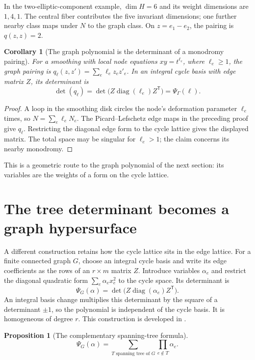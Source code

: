 \documentclass[11pt]{article}
\newtheorem{proposition}[theorem]{Proposition}
\newtheorem{corollary}[theorem]{Corollary}
\theoremstyle{definition}
\theoremstyle{remark}
\begin{document}
In the two-elliptic-component example, $\dim H=6$ and its weight dimensions
are $1,4,1$. The central fiber contributes the five invariant dimensions;
one further nearby class maps under $N$ to the graph class. On
$z=e_1-e_2$, the pairing is $q(z,z)=2$.

\begin{corollary}[The graph polynomial is the determinant of a monodromy pairing]
\label{cor:derived-monodromy-determinant}
For a smoothing with local node equations $xy=t^{\ell_e}$, where
$\ell_e\ge1$, the graph pairing is
$q_\ell(z,z')=\sum_e\ell_ez_ez'_e$. In an integral cycle basis with edge
matrix $Z$, its determinant is
\[
 \det(q_\ell)=\det\bigl(Z\operatorname{diag}(\ell_e)Z^{\mathsf T}\bigr)
             =\Psi_\Gamma(\ell).
\]
\end{corollary}
\begin{proof}
A loop in the smoothing disk circles the node's deformation parameter
$\ell_e$ times, so $N=\sum_e\ell_eN_e$. The Picard--Lefschetz edge maps
in the preceding proof give $q_\ell$. Restricting the diagonal edge form
to the cycle lattice gives the displayed matrix. The total space may be
singular for $\ell_e>1$; the claim concerns its nearby monodromy.
\end{proof}
This is a geometric route to the graph polynomial of the next section:
its variables are the weights of a form on the cycle lattice.

\section{The tree determinant becomes a graph hypersurface}
\label{sec:graph-hypersurface}

A different construction retains how the cycle lattice sits in the edge
lattice.  For a finite connected graph $G$, choose an integral cycle
basis and write its edge coefficients as the rows of an $r\times m$
matrix $Z$.  Introduce variables $\alpha_e$ and restrict the diagonal
quadratic form $\sum_e\alpha_e x_e^2$ to the cycle space.  Its determinant
is
\[
  \Psi_G(\alpha)=\det\bigl(Z\operatorname{diag}(\alpha_e)Z^{\mathsf T}\bigr).
\]
An integral basis change multiplies this determinant by the square of a
determinant $\pm1$, so the polynomial is independent of the cycle basis.
It is homogeneous of degree $r$.  This construction is developed in
\cite[\S1--2]{BEKGraphPolynomials}.

\begin{proposition}[The complementary spanning-tree formula]
\[
  \Psi_G(\alpha)=\sum_{T\text{ spanning tree of }G}
       \prod_{e\notin T}\alpha_e.
\]
\end{proposition}
\end{document}
